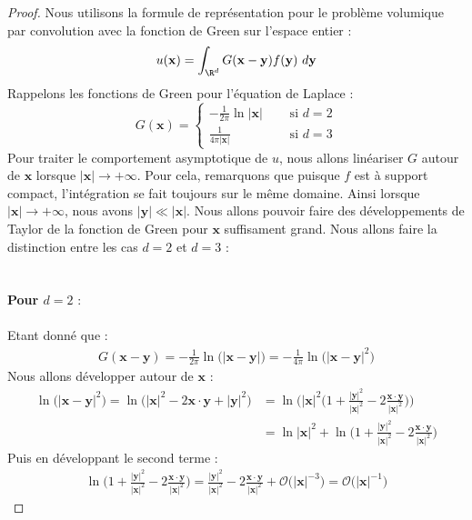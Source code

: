 \begin{proof}
Nous utilisons la formule de représentation pour le problème volumique par convolution avec la fonction de Green sur l'espace entier :
$$ u(\mathbf{x}) = \int_{\R^d} G(\mathbf{x  -  y})f(\mathbf{y}) \ d\mathbf{y} $$
Rappelons les fonctions de Green pour l'équation de Laplace :
$$G(\mathbf{x}) = \begin{cases}
    -\frac{1}{2\pi}\ln |\mathbf{x}| \quad &\text{ si } d = 2 \\
    \frac{1}{4\pi |\mathbf{x}|} &\text{ si } d = 3
\end{cases}$$
Pour traiter le comportement asymptotique de $u$, nous allons linéariser $G$ autour de $\mathbf{x}$ lorsque $|\mathbf{x}| \to +\infty$. Pour cela, remarquons que puisque $f$ est à support compact, l'intégration se fait toujours sur le même domaine. Ainsi lorsque $|\mathbf{x}| \to +\infty$, nous avons $|\mathbf{y}| \ll |\mathbf{x}|$. 
Nous allons pouvoir faire des développements de Taylor de la fonction de Green pour $\mathbf{x}$ suffisament grand.
Nous allons faire la distinction entre les cas $d = 2$ et $d=3$ :\\
\\
\\
\textbf{Pour $d= 2$} :\\
\\
Etant donné que :
\begin{align*}
    G(\mathbf{x - y}) = -\frac{1}{2\pi} \ln\big(|\mathbf{x - y}|\big) = -\frac{1}{4\pi}\ln\big( |\mathbf{x - y}|^2 \big)
\end{align*}
Nous allons développer autour de $\mathbf{x}$ :
\begin{align*}
    \ln\big( |\mathbf{x - y}|^2 \big) = \ln\Big( |\mathbf{x}|^2 - 2\mathbf{x} \cdot \mathbf{y} + |\mathbf{y}|^2 \Big) &= \ln\bigg( |\mathbf{x}|^2 \Big( 1 + \frac{|\mathbf{y}|^2}{|\mathbf{x}|^2} - 2 \frac{\mathbf{x} \cdot \mathbf{y}}{|\mathbf{x}|^2} \Big) \bigg) \\
    &= \ln |\mathbf{x}|^2 + \ln \bigg( 1 + \frac{|\mathbf{y}|^2}{|\mathbf{x}|^2} - 2 \frac{\mathbf{x} \cdot \mathbf{y}}{|\mathbf{x}|^2} \bigg)
\end{align*}
Puis en développant le second terme :
\begin{align*}
    \ln \bigg( 1 + \frac{|\mathbf{y}|^2}{|\mathbf{x}|^2} - 2 \frac{\mathbf{x} \cdot \mathbf{y}}{|\mathbf{x}|^2} \bigg) = \frac{|\mathbf{y}|^2}{|\mathbf{x}|^2} - 2 \frac{\mathbf{x} \cdot \mathbf{y}}{|\mathbf{x}|^2} + \mathcal{O}\big(|\mathbf{x}|^{-3}\big) = \mathcal{O}\big( |\mathbf{x}|^{-1} \big)

\end{align*}
\end{proof}
